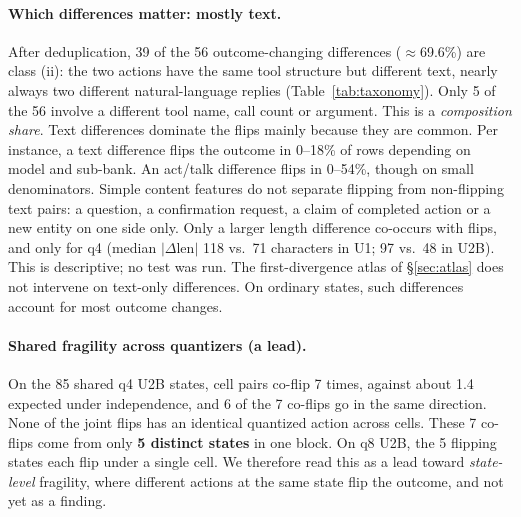 \paragraph{Which differences matter: mostly text.} After deduplication, 39 of the 56 outcome-changing differences ($\approx$69.6\%) are class (ii): the two actions have the same tool structure but different text, nearly always two different natural-language replies (Table~\ref{tab:taxonomy}). Only 5 of the 56 involve a different tool name, call count or argument. %
This is a \emph{composition share}. Text differences dominate the flips mainly because they are common. Per instance, a text difference flips the outcome in 0--18\% of rows depending on model and sub-bank. An act/talk difference flips in 0--54\%, though on small denominators. %
Simple content features do not separate flipping from non-flipping text pairs: a question, a confirmation request, a claim of completed action or a new entity on one side only. Only a larger length difference co-occurs with flips, and only for q4 (median $|\Delta\text{len}|$ 118 vs.\ 71 characters in U1; 97 vs.\ 48 in U2B). This is descriptive; no test was run. %
The first-divergence atlas of \S\ref{sec:atlas} does not intervene on text-only differences. On ordinary states, such differences account for most outcome changes.

\paragraph{Shared fragility across quantizers (a lead).} On the 85 shared q4 U2B states, cell pairs co-flip 7 times, against about 1.4 expected under independence, and 6 of the 7 co-flips go in the same direction. None of the joint flips has an identical quantized action across cells. These 7 co-flips come from only \textbf{5 distinct states} in one block. %
On q8 U2B, the 5 flipping states each flip under a single cell. We therefore read this as a lead toward \emph{state-level} fragility, where different actions at the same state flip the outcome, and not yet as a finding. 

